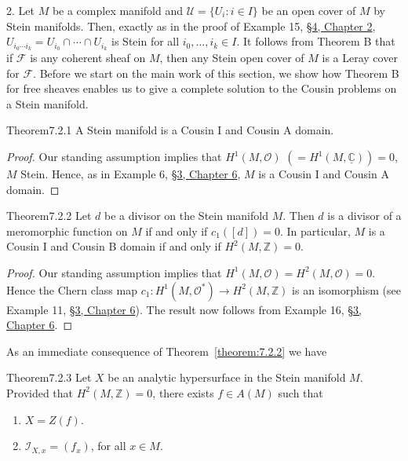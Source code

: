 2. Let $M$ be a complex manifold and $\mathcal{U}=\{U_i:i\in I\}$ be an open cover of $M$ by Stein manifolds. Then, exactly as in the proof of Example 15, \hyperref[sec:2:4]{\S4, Chapter 2}, $U_{i_0\cdots i_k}=U_{i_0}\cap\cdots\cap U_{i_k}$ is Stein for all $i_0,\ldots,i_k\in I$. It follows from Theorem B that if $\mathcal{F}$ is any coherent sheaf on $M$, then any Stein open cover of $M$ is a Leray cover for $\mathcal{F}$.
Before we start on the main work of this section, we show how Theorem B for free sheaves enables us to give a complete solution to the Cousin problems on a Stein manifold.
\begin{originaltheorem}{Theorem}{7.2.1}
A Stein manifold is a Cousin I and Cousin A domain.
\end{originaltheorem}
\begin{proof}
Our standing assumption implies that $H^1(M,\mathcal{O})$ $(=H^1(M,\underline{\mathbb{C}}))=0$, $M$ Stein. Hence, as in Example 6, \hyperref[sec:6:3]{\S3, Chapter 6}, $M$ is a Cousin I and Cousin A domain.
\end{proof}
\begin{originaltheorem}{Theorem}{7.2.2}
Let $d$ be a divisor on the Stein manifold $M$. Then $d$ is a divisor of a meromorphic function on $M$ if and only if $c_1([d])=0$. In particular, $M$ is a Cousin I and Cousin B domain if and only if $H^2(M,\mathbb{Z})=0$.
\end{originaltheorem}
\begin{proof}
Our standing assumption implies that $H^1(M,\mathcal{O})=H^2(M,\mathcal{O})=0$. Hence the Chern class map $c_1:H^1(M,\mathcal{O}^*)\to H^2(M,\mathbb{Z})$ is an isomorphism (see Example 11, \hyperref[sec:6:3]{\S3, Chapter 6}). The result now follows from Example 16, \hyperref[sec:6:3]{\S3, Chapter 6}.
\end{proof}
As an immediate consequence of Theorem~\ref{theorem:7.2.2} we have
\begin{originaltheorem}{Theorem}{7.2.3}
Let $X$ be an analytic hypersurface in the Stein manifold $M$. Provided that $H^2(M,\mathbb{Z})=0$, there exists $f\in A(M)$ such that
\begin{enumerate}[label=\arabic*.]
\item $X=Z(f)$.
\item $\mathcal{I}_{X,x}=(f_x)$, for all $x\in M$.
\end{enumerate}
\end{originaltheorem}
